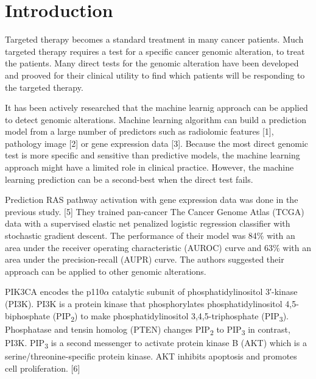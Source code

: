 \documentclass[10pt,letterpaper]{article}
\begin{document}

\linenumbers

\hypertarget{introduction}{%
\section{Introduction}\label{introduction}}

Targeted therapy becomes a standard treatment in many cancer patients.
Much targeted therapy requires a test for a specific cancer genomic
alteration, to treat the patients. Many direct tests for the genomic
alteration have been developed and prooved for their clinical utility to
find which patients will be responding to the targeted therapy.

It has been actively researched that the machine learnig approach can be
applied to detect genomic alterations. Machine learning algorithm can
build a prediction model from a large number of predictors such as
radiolomic features {[}1{]}, pathology image {[}2{]} or gene expression
data {[}3{]}. Because the most direct genomic test is more specific and
sensitive than predictive models, the machine learning approach might
have a limited role in clinical practice. However, the machine learning
prediction can be a second-best when the direct test fails.

Prediction RAS pathway activation with gene expression data was done in
the previous study. {[}5{]} They trained pan-cancer The Cancer Genome
Atlas (TCGA) data with a supervised elastic net penalized logistic
regression classifier with stochastic gradient descent. The performance
of their model was 84\% with an area under the receiver operating
characteristic (AUROC) curve and 63\% with an area under the
precision-recall (AUPR) curve. The authors suggested their approach can
be applied to other genomic alterations.

PIK3CA encodes the p110\(\alpha\) catalytic subunit of
phosphatidylinositol 3′-kinase (PI3K). PI3K is a protein kinase that
phosphorylates phosphatidylinositol 4,5-biphosphate
(PIP\textsubscript{2}) to make phosphatidylinositol 3,4,5-triphosphate
(PIP\textsubscript{3}). Phosphatase and tensin homolog (PTEN) changes
PIP\textsubscript{2} to PIP\textsubscript{3} in contrast, PI3K.
PIP\textsubscript{3} is a second messenger to activate protein kinase B
(AKT) which is a serine/threonine-specific protein kinase. AKT inhibits
apoptosis and promotes cell proliferation. {[}6{]}
\end{document}
